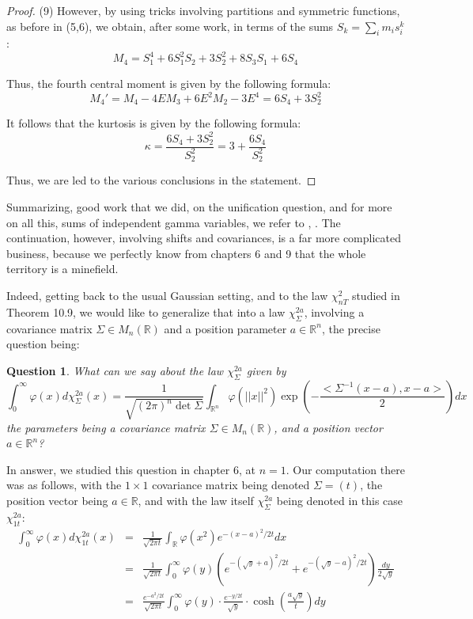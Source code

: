 \documentclass[12pt]{amsbook}
\newtheorem{question}[theorem]{Question}
\begin{document}
\begin{proof}
(9) However, by using tricks involving partitions and symmetric functions, as before in (5,6), we obtain, after some work, in terms of the sums $S_k=\sum_im_is_i^k$:
$$M_4=S_1^4+6S_1^2S_2+3S_2^2+8S_3S_1+6S_4$$

Thus, the fourth central moment is given by the following formula:
$$M_4'
=M_4-4EM_3+6E^2M_2-3E^4
=6S_4+3S_2^2$$ 

It follows that the kurtosis is given by the following formula:
$$\kappa=\frac{6S_4+3S_2^2}{S_2^2}=3+\frac{6S_4}{S_2^2}$$

Thus, we are led to the various conclusions in the statement.
\end{proof}

Summarizing, good work that we did, on the unification question, and for more on all this, sums of independent gamma variables, we refer to \cite{mat}, \cite{mos}. The continuation, however, involving shifts and covariances, is a far more complicated business, because we perfectly know from chapters 6 and 9 that the whole territory is a minefield. 

\bigskip

Indeed, getting back to the usual Gaussian setting, and to the law $\chi_{nT}^2$ studied in Theorem 10.9, we would like to generalize that into a law $\chi_\Sigma^{2a}$, involving a covariance matrix $\Sigma\in M_n(\mathbb R)$ and a position parameter $a\in\mathbb R^n$, the precise question being:

\begin{question}
What can we say about the law $\chi_\Sigma^{2a}$ given by
$$\int_0^\infty\varphi(x)d\chi_\Sigma^{2a}(x)
=\frac{1}{\sqrt{(2\pi)^n\det\Sigma}}\int_{\mathbb R^n}\varphi(||x||^2)\exp\left(-\frac{<\Sigma^{-1}(x-a),x-a>}{2}\right)dx$$
the parameters being a covariance matrix $\Sigma\in M_n(\mathbb R)$, and a position vector $a\in\mathbb R^n$?
\end{question}

In answer, we studied this question in chapter 6, at $n=1$. Our computation there was as follows, with the $1\times 1$ covariance matrix being denoted $\Sigma=(t)$, the position vector being $a\in\mathbb R$, and with the law itself $\chi_\Sigma^{2a}$ being denoted in this case $\chi_{1t}^{2a}$:
\begin{eqnarray*}
\int_0^\infty\varphi(x)d\chi_{1t}^{2a}(x)
&=&\frac{1}{\sqrt{2\pi t}}\int_\mathbb R\varphi(x^2)e^{-(x-a)^2/2t}dx\\
&=&\frac{1}{\sqrt{2\pi t}}\int_0^\infty\varphi(y)\left(e^{-(\sqrt{y}+a)^2/2t}+e^{-(\sqrt{y}-a)^2/2t}\right)\frac{dy}{2\sqrt{y}}\\
&=&\frac{e^{-a^2/2t}}{\sqrt{2\pi t}}\int_0^\infty\varphi(y)\cdot\frac{e^{-y/2t}}{\sqrt{y}}
\cdot\cosh\left(\frac{a\sqrt{y}}{t}\right)dy
\end{eqnarray*}
\end{document}
